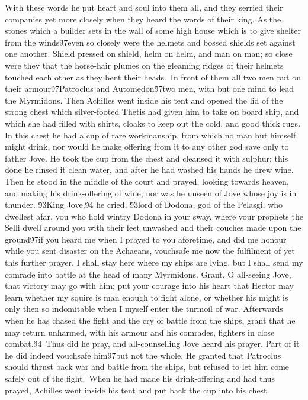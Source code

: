 {With these words he put heart and soul into them all, and they serried their companies yet more closely when they heard the words of their king. As the stones which a builder sets in the wall of some high house which is to give shelter from the winds\'97even so closely were the helmets and bossed shields set against one another. Shield pressed on shield, helm on helm, and man on man; so close were they that the horse-hair plumes on the gleaming ridges of their helmets touched each other as they bent their heads.\
In front of them all two men put on their armour\'97Patroclus and Automedon\'97two men, with but one mind to lead the Myrmidons. Then Achilles went inside his tent and opened the lid of the strong chest which silver-footed Thetis had given him to take on board ship, and which she had filled with shirts, cloaks to keep out the cold, and good thick rugs. In this chest he had a cup of rare workmanship, from which no man but himself might drink, nor would he make offering from it to any other god save only to father Jove. He took the cup from the chest and cleansed it with sulphur; this done he rinsed it clean water, and after he had washed his hands he drew wine. Then he stood in the middle of the court and prayed, looking towards heaven, and making his drink-offering of wine; nor was he unseen of Jove whose joy is in thunder. \'93King Jove,\'94 he cried, \'93lord of Dodona, god of the Pelasgi, who dwellest afar, you who hold wintry Dodona in your sway, where your prophets the Selli dwell around you with their feet unwashed and their couches made upon the ground\'97if you heard me when I prayed to you aforetime, and did me honour while you sent disaster on the Achaeans, vouchsafe me now the fulfilment of yet this further prayer. I shall stay here where my ships are lying, but I shall send my comrade into battle at the head of many Myrmidons. Grant, O all-seeing Jove, that victory may go with him; put your courage into his heart that Hector may learn whether my squire is man enough to fight alone, or whether his might is only then so indomitable when I myself enter the turmoil of war. Afterwards when he has chased the fight and the cry of battle from the ships, grant that he may return unharmed, with his armour and his comrades, fighters in close combat.\'94\
Thus did he pray, and all-counselling Jove heard his prayer. Part of it he did indeed vouchsafe him\'97but not the whole. He granted that Patroclus should thrust back war and battle from the ships, but refused to let him come safely out of the fight.\
When he had made his drink-offering and had thus prayed, Achilles went inside his tent and put back the cup into his chest.\
}
